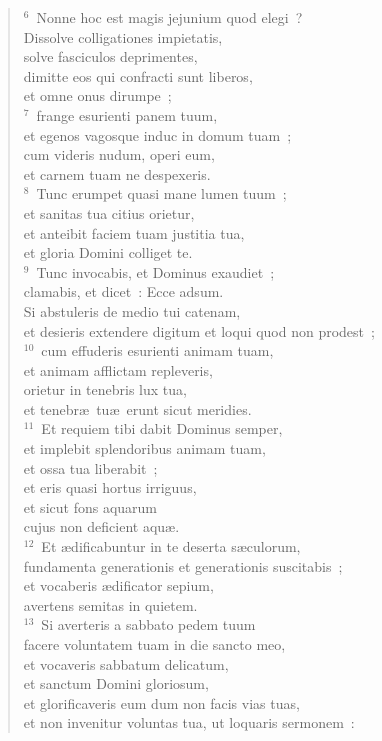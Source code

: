 \begin{flushleft}\begin{verse}${}^{6}$~Nonne hoc est magis jejunium quod elegi~?\\ Dissolve colligationes impietatis,\\ solve fasciculos deprimentes,\\ dimitte eos qui confracti sunt liberos,\\ et omne onus dirumpe~;\\
${}^{7}$~frange esurienti panem tuum,\\ et egenos vagosque induc in domum tuam~;\\ cum videris nudum, operi eum,\\ et carnem tuam ne despexeris.\\
${}^{8}$~Tunc erumpet quasi mane lumen tuum~;\\ et sanitas tua citius orietur,\\ et anteibit faciem tuam justitia tua,\\ et gloria Domini colliget te.\\
${}^{9}$~Tunc invocabis, et Dominus exaudiet~;\\ clamabis, et dicet~: Ecce adsum.\\ Si abstuleris de medio tui catenam,\\ et desieris extendere digitum et loqui quod non prodest~;\\
${}^{10}$~cum effuderis esurienti animam tuam,\\ et animam afflictam repleveris,\\ orietur in tenebris lux tua,\\ et tenebr\ae\ tu\ae\ erunt sicut meridies.\\
${}^{11}$~Et requiem tibi dabit Dominus semper,\\ et implebit splendoribus animam tuam,\\ et ossa tua liberabit~;\\ et eris quasi hortus irriguus,\\ et sicut fons aquarum\\ cujus non deficient aqu\ae .\\
${}^{12}$~Et \ae dificabuntur in te deserta s\ae culorum,\\ fundamenta generationis et generationis suscitabis~;\\ et vocaberis \ae dificator sepium,\\ avertens semitas in quietem.\\
${}^{13}$~Si averteris a sabbato pedem tuum\\ facere voluntatem tuam in die sancto meo,\\ et vocaveris sabbatum delicatum,\\ et sanctum Domini gloriosum,\\ et glorificaveris eum dum non facis vias tuas,\\ et non invenitur voluntas tua, ut loquaris sermonem~:\\

\end{verse}
\end{flushleft}
